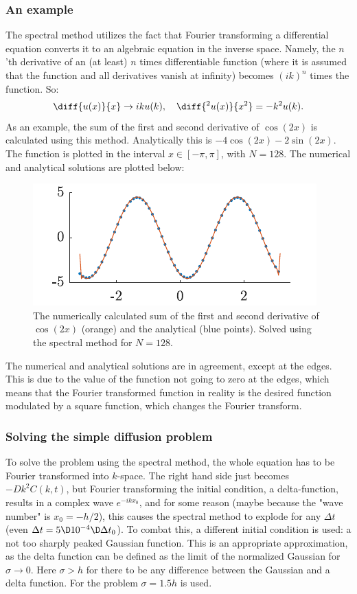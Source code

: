 \documentclass[a4paper,10pt]{article} 	%
\numberwithin{equation}{section}
\begin{document}
	\subsubsection{An example}
	The spectral method utilizes the fact that Fourier transforming a differential equation converts it to an algebraic equation in the inverse space. Namely, the $ n $'th derivative of an (at least) $ n $ times differentiable function (where it is assumed that the function and all derivatives vanish at infinity) becomes $ (ik)^n $ times the function. So:
	\begin{equation}\label{key}
		\diff{u(x)}{x} \to ik u(k), \quad \diff{^2u(x)}{x^2} = -k^2 u(k).
	\end{equation}
	As an example, the sum of the first and second derivative of $ \cos(2x) $ is calculated using this method. Analytically this is $ -4\cos(2x) -2 \sin(2x) $. The function is plotted in the interval $ x \in [-\pi,\pi] $, with $ N=128 $. The numerical and analytical solutions are plotted below:
	\begin{figure}[H]
		\centering
		\includegraphics[width = 0.5\linewidth]{spectralEx.pdf}
		\caption{The numerically calculated sum of the first and second derivative of $ \cos(2x) $ (orange) and the analytical (blue points). Solved using the spectral method for $ N=128 $.}
		\label{fig:spectralEx}
	\end{figure}
	The numerical and analytical solutions are in agreement, except at the edges. This is due to the value of the function not going to zero at the edges, which means that the Fourier transformed function in reality is the desired function modulated by a square function, which changes the Fourier transform.
	
	\subsubsection{Solving the simple diffusion problem}
	To solve the problem using the spectral method, the whole equation has to be Fourier transformed into $ k $-space. The right hand side just becomes $ -Dk^2 C(k,t) $, but Fourier transforming the initial condition, a delta-function, results in a complex wave $ e^{-ikx_0} $, and for some reason (maybe because the "wave number" is $ x_0 = -h/2 $), this causes the spectral method to explode for any $ \Delta t $ (even $ \Delta t = 5\D10^{-4}\D \Delta t_0 $). To combat this, a different initial condition is used: a not too sharply peaked Gaussian function. This is an appropriate approximation, as the delta function can be defined as the limit of the normalized Gaussian for $ \sigma \to 0 $. Here $ \sigma > h $ for there to be any difference between the Gaussian and a delta function. For the problem $ \sigma = 1.5h $ is used.
 	
\end{document}
